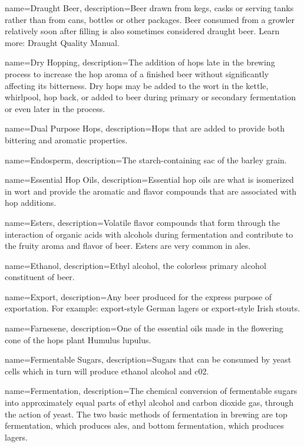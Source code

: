 {
  name={Draught Beer},
  description={Beer drawn from kegs, casks or serving tanks rather than from cans, bottles or other packages. Beer consumed from a growler relatively soon after filling is also sometimes considered draught beer. Learn more: Draught Quality Manual.}
  }

{
  name={Dry Hopping},
  description={The addition of hops late in the brewing process to increase the hop aroma of a finished beer without significantly affecting its bitterness. Dry hops may be added to the wort in the kettle, whirlpool, hop back, or added to beer during primary or secondary fermentation or even later in the process.}
  }

{
  name={Dual Purpose Hops},
  description={Hops that are added to provide both bittering and aromatic properties.}
  }

{
  name={Endosperm},
  description={The starch-containing sac of the barley grain.}
  }

{
  name={Essential Hop Oils},
  description={Essential hop oils are what is isomerized in wort and provide the aromatic and flavor compounds that are associated with hop additions.}
  }

{
  name={Esters},
  description={Volatile flavor compounds that form through the interaction of organic acids with alcohols during fermentation and contribute to the fruity aroma and flavor of beer. Esters are very common in ales.}
  }

{
  name={Ethanol},
  description={Ethyl alcohol, the colorless primary alcohol constituent of beer.}
  }

{
  name={Export},
  description={Any beer produced for the express purpose of exportation. For example: export-style German lagers or export-style Irish stouts.}
  }

{
  name={Farnesene},
  description={One of the essential oils made in the flowering cone of the hops plant Humulus lupulus.}
  }

{
  name={Fermentable Sugars},
  description={Sugars that can be consumed by yeast cells which in turn will produce ethanol alcohol and c02.}
  }

{
  name={Fermentation},
  description={The chemical conversion of fermentable sugars into approximately equal parts of ethyl alcohol and carbon dioxide gas, through the action of yeast. The two basic methods of fermentation in brewing are top fermentation, which produces ales, and bottom fermentation, which produces lagers.}
  }

